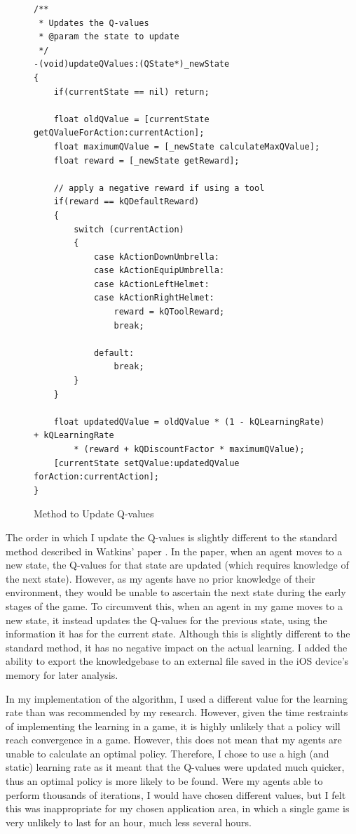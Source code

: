 \documentclass[a4paper,oneside]{report}
\begin{document}
\begin{figure}[h!]
\begin{lstlisting}
/**
 * Updates the Q-values
 * @param the state to update
 */
-(void)updateQValues:(QState*)_newState
{    
    if(currentState == nil) return;
            
    float oldQValue = [currentState getQValueForAction:currentAction];
    float maximumQValue = [_newState calculateMaxQValue];
    float reward = [_newState getReward];
    
    // apply a negative reward if using a tool
    if(reward == kQDefaultReward) 
    {
        switch (currentAction)
        {
            case kActionDownUmbrella:
            case kActionEquipUmbrella:
            case kActionLeftHelmet:
            case kActionRightHelmet:
                reward = kQToolReward;
                break;
                
            default:
                break;
        } 
    }
        
    float updatedQValue = oldQValue * (1 - kQLearningRate) + kQLearningRate 
    	* (reward + kQDiscountFactor * maximumQValue);
    [currentState setQValue:updatedQValue forAction:currentAction];
}
\end{lstlisting}
\caption{Method to Update Q-values}
\end{figure}

The order in which I update the Q-values is slightly different to the standard method described in Watkins' paper \cite{Watkins:1989mi}. In the paper, when an agent moves to a new state, the Q-values for that state are updated (which requires knowledge of the next state). However, as my agents have no prior knowledge of their environment, they would be unable to ascertain the next state during the early stages of the game. To circumvent this, when an agent in my game moves to a new state, it instead updates the Q-values for the previous state, using the information it has for the current state. Although this is slightly different to the standard method, it has no negative impact on the actual learning. I added the ability to export the knowledgebase to an external file saved in the iOS device's memory for later analysis.

In my implementation of the algorithm, I used a different value for the learning rate than was recommended by my research. However, given the time restraints of implementing the learning in a game, it is highly unlikely that a policy will reach convergence in a game. However, this does not mean that my agents are unable to calculate an optimal policy. Therefore, I chose to use a high (and static) learning rate as it meant that the Q-values were updated much quicker, thus an optimal policy is more likely to be found. Were my agents able to perform thousands of iterations, I would have chosen different values, but I felt this was inappropriate for my chosen application area, in which a single game is very unlikely to last for an hour, much less several hours.
\end{document}
